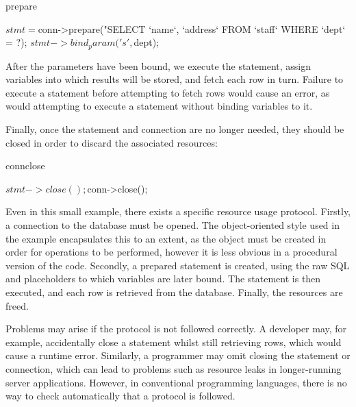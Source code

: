 \begin{SaveVerbatim}{prepare}

  $stmt = $conn->prepare("SELECT `name`, `address` 
     FROM `staff` WHERE `dept` = ?);
  $stmt->bind_param('s', $dept);

\end{SaveVerbatim}

\noindent
After the parameters have been bound, we execute the statement, assign
variables into which results will be stored, and fetch each row in turn. 
Failure to execute a statement before attempting to fetch rows would cause an error, as would attempting to execute a statement without binding variables to it.


\noindent
Finally, once the statement and connection are no longer needed, they should be
closed in order to discard the associated resources:

\begin{SaveVerbatim}{connclose}

  $stmt->close();
  $conn->close();

\end{SaveVerbatim}

\noindent
Even in this small example, there exists a specific resource usage protocol.
Firstly, a connection to the database must be opened. The object-oriented style
used in the example encapsulates this to an extent, as the object must be
created in order for operations to be performed, however it is less obvious in
a procedural version of the code. Secondly, a prepared statement is created,
using the raw SQL and placeholders to which variables are later bound. The
statement is then executed, and each row is retrieved from the database.
Finally, the resources are freed. 

Problems may arise if the protocol is not followed correctly.
A developer may, for example, accidentally close a statement whilst still
retrieving rows, which would cause a runtime error. Similarly, a programmer may
omit closing the statement or connection, which can lead to
problems such as resource leaks in longer-running server applications.
However, in conventional programming languages, there is no way to check
automatically that a protocol is followed.

